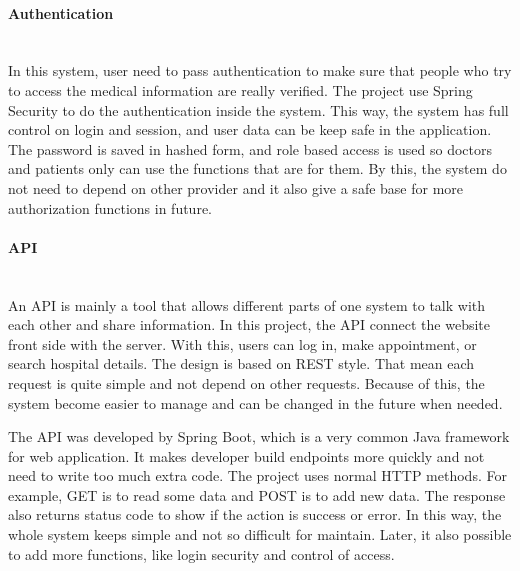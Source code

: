%

\paragraph{Authentication}\mbox{}\\

In this system, user need to pass authentication to make sure that people who try to access the medical information are really verified. The project use Spring Security to do the authentication inside the system. This way, the system has full control on login and session, and user data can be keep safe in the application. The password is saved in hashed form, and role based access is used so doctors and patients only can use the functions that are for them. By this, the system do not need to depend on other provider and it also give a safe base for more authorization functions in future.

\paragraph{API}\mbox{}\\

An API is mainly a tool that allows different parts of one system to talk with each other and share information. In this project, the API connect the website front side with the server. With this, users can log in, make appointment, or search hospital details. The design is based on REST style. That mean each request is quite simple and not depend on other requests. Because of this, the system become easier to manage and can be changed in the future when needed.

The API was developed by Spring Boot, which is a very common Java framework for web application. It makes developer build endpoints more quickly and not need to write too much extra code. The project uses normal HTTP methods. For example, GET is to read some data and POST is to add new data. The response also returns status code to show if the action is success or error. In this way, the whole system keeps simple and not so difficult for maintain. Later, it also possible to add more functions, like login security and control of access.

